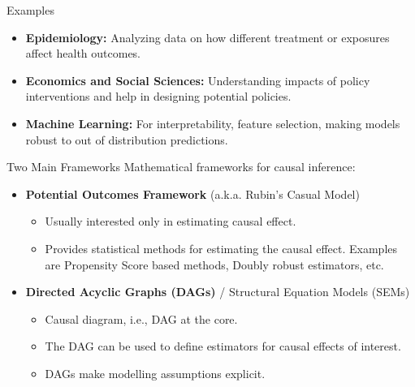 \documentclass{beamer}
\begin{document}
\begin{frame}{Examples}
	\begin{itemize}
		\item \textbf{Epidemiology:} Analyzing data on how different treatment or exposures affect health outcomes.
		\item \textbf{Economics and Social Sciences:} Understanding impacts of policy interventions and help in designing potential policies.
		\item \textbf{Machine Learning:} For interpretability, feature selection, making models robust to out of distribution predictions.
	\end{itemize}
\end{frame}

\begin{frame}{Two Main Frameworks}
	Mathematical frameworks for causal inference:
	\vspace{0.5em}
	\begin{itemize}
		\item \textbf{Potential Outcomes Framework} (a.k.a. Rubin's Casual Model)
			\begin{itemize}
				\item Usually interested only in estimating causal effect.
				\item Provides statistical methods for estimating the causal effect.
					Examples are Propensity Score based methods, Doubly robust estimators, etc.
			\end{itemize}
	\end{itemize}
	\vspace{2em}
	\begin{itemize}
		\item \textbf{Directed Acyclic Graphs (DAGs)} / Structural Equation Models (SEMs)
			\begin{itemize}
				\item Causal diagram, i.e., DAG at the core.
				\item The DAG can be used to define estimators for causal effects of interest.
				\item DAGs make modelling assumptions explicit.
			\end{itemize}
	\end{itemize}
\end{frame}
\end{document}
